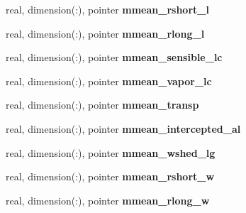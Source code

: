 \begin{DoxyCompactItemize}
\item 
\hypertarget{structed__state__vars_1_1edtype_a3c84be7d7b11ba2ccd2f7c6f4f7b79d8}{
real, dimension(:), pointer {\bfseries mmean\_\-rshort\_\-l}}
\label{structed__state__vars_1_1edtype_a3c84be7d7b11ba2ccd2f7c6f4f7b79d8}

\item 
\hypertarget{structed__state__vars_1_1edtype_a0b121f5a4573e375c29ce84505891fb6}{
real, dimension(:), pointer {\bfseries mmean\_\-rlong\_\-l}}
\label{structed__state__vars_1_1edtype_a0b121f5a4573e375c29ce84505891fb6}

\item 
\hypertarget{structed__state__vars_1_1edtype_aaaa9c5cbd280ad7457d7a375d3bb6374}{
real, dimension(:), pointer {\bfseries mmean\_\-sensible\_\-lc}}
\label{structed__state__vars_1_1edtype_aaaa9c5cbd280ad7457d7a375d3bb6374}

\item 
\hypertarget{structed__state__vars_1_1edtype_a76da4a5d1628ac2f16cc8a459d3719a6}{
real, dimension(:), pointer {\bfseries mmean\_\-vapor\_\-lc}}
\label{structed__state__vars_1_1edtype_a76da4a5d1628ac2f16cc8a459d3719a6}

\item 
\hypertarget{structed__state__vars_1_1edtype_af0b1ec6d3158da745cdcd04a1b89ddd5}{
real, dimension(:), pointer {\bfseries mmean\_\-transp}}
\label{structed__state__vars_1_1edtype_af0b1ec6d3158da745cdcd04a1b89ddd5}

\item 
\hypertarget{structed__state__vars_1_1edtype_adf54e15c0260de1eb6f857a3e5cd26cd}{
real, dimension(:), pointer {\bfseries mmean\_\-intercepted\_\-al}}
\label{structed__state__vars_1_1edtype_adf54e15c0260de1eb6f857a3e5cd26cd}

\item 
\hypertarget{structed__state__vars_1_1edtype_a6338bc622212e2cbf2c844a5d0865b31}{
real, dimension(:), pointer {\bfseries mmean\_\-wshed\_\-lg}}
\label{structed__state__vars_1_1edtype_a6338bc622212e2cbf2c844a5d0865b31}

\item 
\hypertarget{structed__state__vars_1_1edtype_a12991d55feba8ff4c418571262bc9a61}{
real, dimension(:), pointer {\bfseries mmean\_\-rshort\_\-w}}
\label{structed__state__vars_1_1edtype_a12991d55feba8ff4c418571262bc9a61}

\item 
\hypertarget{structed__state__vars_1_1edtype_a04635e5c9cbfb518793474fc9d232a5c}{
real, dimension(:), pointer {\bfseries mmean\_\-rlong\_\-w}}
\label{structed__state__vars_1_1edtype_a04635e5c9cbfb518793474fc9d232a5c}


\end{DoxyCompactItemize}
